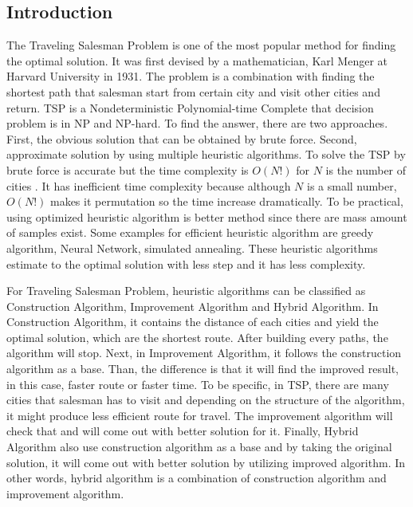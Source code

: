 \documentclass[12pt]{article}
\begin{document}
\subsection*{Introduction}
The Traveling Salesman Problem is one of the most popular method for finding the optimal solution. It was first devised by a mathematician, Karl Menger at Harvard University in 1931.\cite{History} The problem is a combination with finding the shortest path that salesman start from certain city and visit other cities and return. TSP is a Nondeterministic Polynomial-time Complete that decision problem is in NP and NP-hard.\cite{NpComplete} To find the answer, there are two approaches. First, the obvious solution that can be obtained by brute force. Second, approximate solution by using multiple heuristic algorithms. To solve the TSP by brute force is accurate but the time complexity is $O(N!)$ for $N$ is the number of cities \cite{BruteForce}. It has inefficient time complexity because although $N$ is a small number, $O(N!)$ makes it permutation so the time increase dramatically. To be practical, using optimized heuristic algorithm is better method since there are mass amount of samples exist. Some examples for efficient heuristic algorithm are greedy algorithm,\cite{Greedy} Neural Network, simulated annealing.\cite{Simulated} These heuristic algorithms estimate to the optimal solution with less step and it has less complexity. \par
For Traveling Salesman Problem, heuristic algorithms can be classified as Construction Algorithm, Improvement Algorithm and Hybrid Algorithm.\cite{Comparison} In Construction Algorithm, it contains the distance of each cities and yield the optimal solution, which are the shortest route. After building every paths, the algorithm will stop. Next, in Improvement Algorithm, it follows the construction algorithm as a base. Than, the difference is that it will find the improved result, in this case, faster route or faster time. To be specific, in TSP, there are many cities that salesman has to visit and depending on the structure of the algorithm, it might produce less efficient route for travel. The improvement algorithm will check that and will come out with better solution for it. Finally, Hybrid Algorithm also use construction algorithm as a base and by taking the original solution, it will come out with better solution by utilizing improved algorithm. In other words, hybrid algorithm is a combination of construction algorithm and improvement algorithm. 
\end{document}
